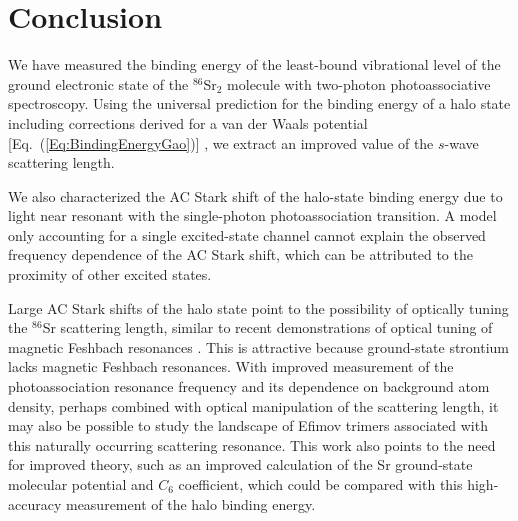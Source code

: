 \chapter{Conclusion}
\label{ch:conclusion}

We have measured the binding energy of the least-bound vibrational level of the ground electronic state of the $^{86}$Sr$_2$ molecule with two-photon photoassociative spectroscopy. Using the universal prediction for the binding energy of a halo state including corrections derived for a van der Waals potential [Eq.\ (\ref{Eq:BindingEnergyGao})] \cite{gfl93,gao01,gao04}, we extract an improved value of the $s$-wave scattering length.

We also characterized the AC Stark shift of the halo-state binding energy due to light near resonant with the single-photon photoassociation transition. A model only accounting for a single excited-state channel \cite{bju96} cannot explain the observed frequency dependence of the AC Stark shift, which can be attributed to the proximity of other excited states.

Large AC Stark shifts of the halo state point to the possibility of optically tuning the $^{86}$Sr scattering length, similar to recent demonstrations of optical tuning of magnetic Feshbach resonances \cite{blv09,chx15}. This is attractive because ground-state strontium lacks magnetic Feshbach resonances. With improved measurement of the photoassociation resonance frequency and its dependence on background atom density, perhaps combined with optical manipulation of the scattering length, it may also be possible to study the landscape of Efimov trimers associated with this naturally occurring scattering resonance. This work also points to the need for improved theory, such as an improved calculation of the Sr ground-state molecular potential and $C_6$ coefficient, which could be compared with this high-accuracy measurement of the halo binding energy.



